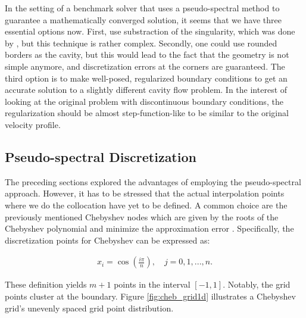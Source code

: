 In the setting of a benchmark solver that uses a pseudo-spectral method to
guarantee a mathematically converged solution, it seems that we have three
essential options now. First, use substraction of the singularity, which was
done by \citep{botella1998}, but this technique is rather complex. Secondly,
one could use rounded borders as the cavity, but this would lead to the fact
that the geometry is not simple anymore, and discretization errors at the corners
are guaranteed. The third option is to make well-posed,
regularized boundary conditions to get an accurate solution to a slightly
different cavity flow problem. In the interest of looking at the original
problem with discontinuous boundary conditions, the regularization should be
almost step-function-like to be similar to the original velocity profile.

\subsection{Pseudo-spectral Discretization}

The preceding sections explored the advantages of employing the pseudo-spectral
approach. However, it has to be stressed that the actual interpolation points
where we do the collocation have yet to be defined. A common choice are the
previously mentioned Chebyshev nodes which are given by the roots of the
Chebyshev polynomial and minimize the approximation error \citep{boyd2001}.
Specifically, the discretization points for Chebyshev can be expressed as:

\begin{align}
x_i = \cos(\frac{i \pi}{n}), \quad j=0, 1,...,n.
\label{eq:cheb_nodes1d}
\end{align}

These definition yields $m+1$ points in the interval $[-1, 1]$. Notably, the
grid points cluster at the boundary. Figure \ref{fig:cheb_grid1d} illustrates a
Chebyshev grid's unevenly spaced grid point distribution.

